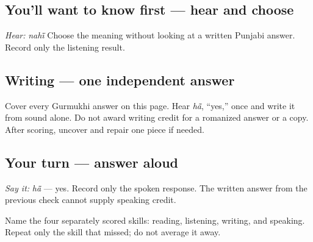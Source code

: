 \subsection*{You'll want to know first — hear and choose}
\emph{Hear:} \emph{nahī̃} Choose the meaning without looking at a written Punjabi answer. Record only the listening result.

\subsection*{Writing — one independent answer}
Cover every Gurmukhi answer on this page. Hear \emph{hā̃}, “yes,” once and write it from sound alone. Do not award writing credit for a romanized answer or a copy. After scoring, uncover \textbf{} and repair one piece if needed.

\subsection*{Your turn — answer aloud}
\emph{Say it:} \emph{hā̃} — yes. Record only the spoken response. The written answer from the previous check cannot supply speaking credit.

\begin{tcolorbox}[breakable,colback=teal!4,colframe=teal!35!black,title={Before you move on}]
Name the four separately scored skills: reading, listening, writing, and speaking. Repeat only the skill that missed; do not average it away.
\end{tcolorbox}
